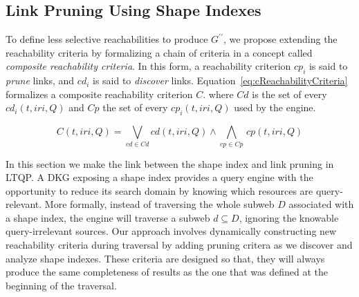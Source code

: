 \subsection{Link Pruning Using Shape Indexes}\label{sec:sourceSelection}

To define less selective reachabilities to produce $G^{\prime\prime}$, we propose extending the reachability criteria by formalizing a chain of criteria in a concept called \emph{composite reachability criteria}.
In this form, a reachability criterion $cp_i$ is said to \emph{prune} links, and $cd_i$ is said to \emph{discover} links.
Equation~\ref{eq:cReachabilityCriteria} formalizes a composite reachability criterion $C$.
where $Cd$ is the set of every $cd_i(t, iri, Q)$ and $Cp$ the set of every $cp_i(t, iri, Q)$ used by the engine.

\begin{equation}\label{eq:cReachabilityCriteria}
   C(t, iri, Q) = \bigvee_{cd \in Cd} cd(t, iri, Q) \mathrel{\land} \bigwedge_{cp \in Cp} \, cp(t, iri, Q)
\end{equation}

In this section we make the link between the shape index and link pruning in LTQP.
A DKG exposing a shape index provides a query engine with the opportunity to reduce its search domain by knowing which resources are query-relevant.
More formally, instead of traversing the whole subweb $D$ associated with a shape index, the engine will traverse a subweb $d \subseteq D$, ignoring the knowable query-irrelevant sources.
Our approach involves dynamically constructing new reachability criteria during traversal by adding pruning critera as we discover and analyze shape indexes.
These criteria are designed so that, they will always produce the same completeness of results as the one that was defined at the beginning of the traversal.

